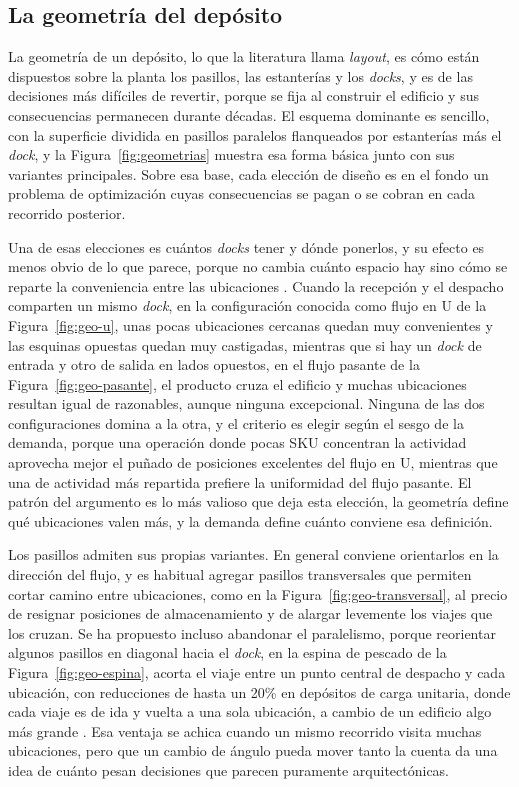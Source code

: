 \subsection{La geometría del depósito}

La geometría de un depósito, lo que la literatura llama \emph{layout}, es cómo están dispuestos sobre la planta los pasillos, las estanterías y los \emph{docks}, y es de las decisiones más difíciles de revertir, porque se fija al construir el edificio y sus consecuencias permanecen durante décadas.
El esquema dominante es sencillo, con la superficie dividida en pasillos paralelos flanqueados por estanterías más el \emph{dock}, y la Figura~\ref{fig:geometrias} muestra esa forma básica junto con sus variantes principales.
Sobre esa base, cada elección de diseño es en el fondo un problema de optimización cuyas consecuencias se pagan o se cobran en cada recorrido posterior.

Una de esas elecciones es cuántos \emph{docks} tener y dónde ponerlos, y su efecto es menos obvio de lo que parece, porque no cambia cuánto espacio hay sino cómo se reparte la conveniencia entre las ubicaciones \citep[sección~6.2]{bartholdi2014warehouse}.
Cuando la recepción y el despacho comparten un mismo \emph{dock}, en la configuración conocida como flujo en U de la Figura~\ref{fig:geo-u}, unas pocas ubicaciones cercanas quedan muy convenientes y las esquinas opuestas quedan muy castigadas, mientras que si hay un \emph{dock} de entrada y otro de salida en lados opuestos, en el flujo pasante de la Figura~\ref{fig:geo-pasante}, el producto cruza el edificio y muchas ubicaciones resultan igual de razonables, aunque ninguna excepcional.
Ninguna de las dos configuraciones domina a la otra, y el criterio es elegir según el sesgo de la demanda, porque una operación donde pocas SKU concentran la actividad aprovecha mejor el puñado de posiciones excelentes del flujo en U, mientras que una de actividad más repartida prefiere la uniformidad del flujo pasante.
El patrón del argumento es lo más valioso que deja esta elección, la geometría define qué ubicaciones valen más, y la demanda define cuánto conviene esa definición.

Los pasillos admiten sus propias variantes.
En general conviene orientarlos en la dirección del flujo, y es habitual agregar pasillos transversales que permiten cortar camino entre ubicaciones, como en la Figura~\ref{fig:geo-transversal}, al precio de resignar posiciones de almacenamiento y de alargar levemente los viajes que los cruzan.
Se ha propuesto incluso abandonar el paralelismo, porque reorientar algunos pasillos en diagonal hacia el \emph{dock}, en la espina de pescado de la Figura~\ref{fig:geo-espina}, acorta el viaje entre un punto central de despacho y cada ubicación, con reducciones de hasta un 20\% en depósitos de carga unitaria, donde cada viaje es de ida y vuelta a una sola ubicación, a cambio de un edificio algo más grande \citep{gue2009aisle}.
Esa ventaja se achica cuando un mismo recorrido visita muchas ubicaciones, pero que un cambio de ángulo pueda mover tanto la cuenta da una idea de cuánto pesan decisiones que parecen puramente arquitectónicas.

